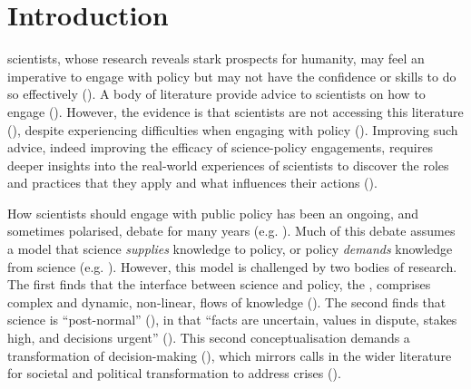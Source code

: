 \chapter{Introduction}\label{ch:intro}

\CAN{} scientists, whose research reveals stark prospects for humanity, may feel an imperative to engage with policy but may not have the confidence or skills to do so effectively (\cite{BednarekSHG2015,KennyRHTB2017,KEU2021perceptions,GeorgescuG2024}). A body of literature provide advice to scientists on how to engage (\cite{OliverC2019}). However, the evidence is that scientists are not accessing this literature (\cite{CairneyTS2023}), despite experiencing difficulties when engaging with policy (\cite{Stirling2010,Obermeister2022,Gerber2023,Hicks2024}). Improving such advice, indeed improving the efficacy of science-policy engagements, requires deeper insights into the real-world experiences of scientists to discover the roles and practices that they apply and what influences their actions  (\cite{KennyRHTB2017}). 

How scientists should engage with public policy has been an ongoing, and sometimes polarised, debate for many years (e.g. \cite{Lackey2004,Nau2009,Stirling2010,Milman2013,Tyler2013,Oreskes2020,GluckmanBK2021,GregoryBW2024,Bisbal2024,Hicks2024}). Much of this debate assumes a model that science \emph{supplies} knowledge to policy, or policy \emph{demands} knowledge from science (e.g. \cite{McNie2007,KennyRHTB2017,Castree2019}). However, this model is challenged by two bodies of research. The first finds that the interface between science and policy, the \SPI, comprises complex and dynamic, non-linear, flows of knowledge (\cite{StrassheimK2014,BoswellS2017}). The second finds that \CAN{} science is ``post-normal'' (\cite{FuntowiczR1993}), in that ``facts are uncertain, values in dispute, stakes high, and decisions urgent'' (\cite[p649]{Ravetz1999}). This second conceptualisation demands a transformation of \CAN{} decision-making (\cite{FuntowiczR1993,Ravetz1999,Jasanoff2003,Hewitt2024}), which mirrors calls in the wider literature for societal and political transformation to address \CAN{} crises (\cite{DiazEtAl2019,LaybournTS2023,VerfuerthDCWP2023,GuptaEtAl2024}).

